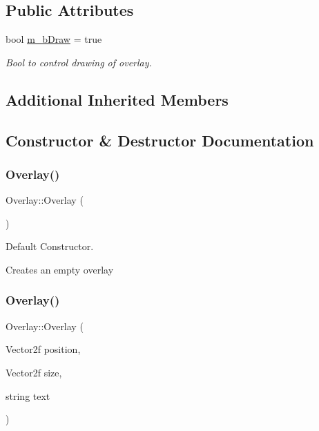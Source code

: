 \subsection*{Public Attributes}
\begin{DoxyCompactItemize}
\item 
\hypertarget{class_overlay_a9a70a96aa1bc41ee3e0c34dfb705f7b9}{}\label{class_overlay_a9a70a96aa1bc41ee3e0c34dfb705f7b9} 
bool \hyperlink{class_overlay_a9a70a96aa1bc41ee3e0c34dfb705f7b9}{m\+\_\+b\+Draw} = true
\begin{DoxyCompactList}\small\item\em Bool to control drawing of overlay. \end{DoxyCompactList}\end{DoxyCompactItemize}
\subsection*{Additional Inherited Members}


\subsection{Constructor \& Destructor Documentation}
\hypertarget{class_overlay_ab4f509d502931bcaad03418470993d70}{}\label{class_overlay_ab4f509d502931bcaad03418470993d70} 
\subsubsection{\texorpdfstring{Overlay()}{Overlay()}\hspace{0.1cm}{\footnotesize\ttfamily [1/2]}}
{\footnotesize\ttfamily Overlay\+::\+Overlay (\begin{DoxyParamCaption}{ }\end{DoxyParamCaption})}



Default Constructor. 

Creates an empty overlay \hypertarget{class_overlay_a6cd84b6dc4fdcb2a6fbfafaf5e63e170}{}\label{class_overlay_a6cd84b6dc4fdcb2a6fbfafaf5e63e170} 
\subsubsection{\texorpdfstring{Overlay()}{Overlay()}\hspace{0.1cm}{\footnotesize\ttfamily [2/2]}}
{\footnotesize\ttfamily Overlay\+::\+Overlay (\begin{DoxyParamCaption}\item[{Vector2f}]{position,  }\item[{Vector2f}]{size,  }\item[{string}]{text }\end{DoxyParamCaption})}



